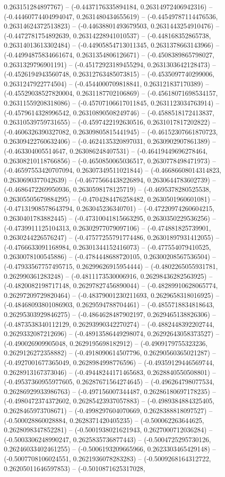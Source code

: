 0.263151284897767) -- (-0.4437176335894184, 0.26314972406942316) -- (-0.44460774404994047, 0.2631480434655619) -- (-0.44549787114476536, 0.26314624372513823) -- (-0.44638801493679503, 0.2631443254910476) -- (-0.4472781754892639, 0.26314228941010537) -- (-0.448168352865738, 0.26314013613302484) -- (-0.44905854713011345, 0.2631378663143966) -- (-0.44994875834661674, 0.2631354806126671) -- (-0.4508389865798027, 0.2631329796901191) -- (-0.45172923189455294, 0.2631303642128473) -- (-0.4526194943560748, 0.26312763485073815) -- (-0.4535097740299006, 0.2631247922774504) -- (-0.4544000709818841, 0.263121837170389) -- (-0.45529038527820004, 0.2631187702106869) -- (-0.45618071698534157, 0.26311559208318086) -- (-0.45707106617011845, 0.2631123034763914) -- (-0.4579614328996542, 0.26310890508249746) -- (-0.4588518172413837, 0.26310539759731655) -- (-0.4597422192630516, 0.2631017817202822) -- (-0.4606326390327082, 0.26309805815441945) -- (-0.46152307661870723, 0.26309422760632406) -- (-0.4624135320897031, 0.2630902907861389) -- (-0.463304005514647, 0.263086248407531) -- (-0.46419449696278464, 0.26308210118766856) -- (-0.4650850065036517, 0.2630778498471973) -- (-0.46597553420707094, 0.26307349511021844) -- (-0.46686608014314823, 0.2630690377042639) -- (-0.46775664438226894, 0.2630644783602739) -- (-0.4686472269950936, 0.2630598178125719) -- (-0.4695378280525538, 0.26305505679884295) -- (-0.4704284476258482, 0.2630501960601081) -- (-0.47131908578643794, 0.263045236340701) -- (-0.47220974260604215, 0.2630401783882445) -- (-0.47310041815663295, 0.2630350229536256) -- (-0.4739911125104313, 0.26302977079097106) -- (-0.474881825739901, 0.2630244226576247) -- (-0.47577255791774486, 0.26301897931412055) -- (-0.4766633091168984, 0.26301344152416073) -- (-0.477554079410525, 0.2630078100545886) -- (-0.4784448688720105, 0.26300208567536504) -- (-0.47933567757495715, 0.26299626915954444) -- (-0.4802265055931781, 0.262990361283248) -- (-0.4811173530006916, 0.26298436282563925) -- (-0.4820082198717148, 0.26297827456890044) -- (-0.48289910628065774, 0.26297209729820464) -- (-0.48379001230211693, 0.2629658318016925) -- (-0.48468093801086903, 0.2629594788704461) -- (-0.4855718834818643, 0.26295303929846275) -- (-0.4864628487902197, 0.2629465138826306) -- (-0.4873538340112129, 0.26293990342270274) -- (-0.4882448392202744, 0.2629332087212696) -- (-0.48913586449298074, 0.26292643058373527) -- (-0.490026909905048, 0.2629195698182912) -- (-0.4909179755323236, 0.2629126272358882) -- (-0.4918090614507796, 0.26290560365021287) -- (-0.4927001677365049, 0.2628984998776596) -- (-0.49359129446569744, 0.2628913167373046) -- (-0.49448244171465683, 0.2628840550508801) -- (-0.49537360955977605, 0.26287671564274645) -- (-0.496264798077534, 0.26286929933986763) -- (-0.497156007344487, 0.26286180697178235) -- (-0.4980472374372602, 0.26285423937057883) -- (-0.4989384884325405, 0.2628465973708671) -- (-0.4998297604070669, 0.2628388818097527) -- (-0.500028860028884, 0.2628371420405235) -- (-0.500062263644625, 0.2628098347852281) -- (-0.5001938021621943, 0.2627000712036284) -- (-0.5003306248990247, 0.2625835736877443) -- (-0.5004725295730126, 0.26246033402461255) -- (-0.5006193209665966, 0.2623303465429148) -- (-0.5007708106024551, 0.2621936078283283) -- (-0.5009268164312722, 0.26205011646597853) -- (-0.5010871625317028, 